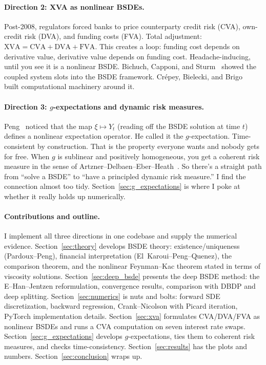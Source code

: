 \documentclass[11pt]{article}
\theoremstyle{definition}
\theoremstyle{remark}
\begin{document}
\paragraph{Direction 2: XVA as nonlinear BSDEs.}
Post-2008, regulators forced banks to price counterparty credit risk
(CVA), own-credit risk (DVA), and funding costs (FVA).
Total adjustment:
$\text{XVA} = \text{CVA} + \text{DVA} + \text{FVA}$.
This creates a loop: funding cost depends on derivative value, derivative
value depends on funding cost.
Headache-inducing, until you see it is a nonlinear BSDE.
Bichuch, Capponi, and Sturm~\cite{bichuch2018xva} showed the coupled
system slots into the BSDE framework.
Cr\'{e}pey, Bielecki, and Brigo~\cite{crepey2014counterparty} built
computational machinery around it.

\paragraph{Direction 3: $g$-expectations and dynamic risk measures.}
Peng~\cite{peng2004nonlinear,peng2019nonlinear} noticed that the map
$\xi \mapsto Y_t$ (reading off the BSDE solution at time $t$) defines a
nonlinear expectation operator.
He called it the $g$-expectation.
Time-consistent by construction. That is the property everyone wants
and nobody gets for free.
When $g$ is sublinear and positively homogeneous, you get a coherent
risk measure in the sense of
Artzner--Delbaen--Eber--Heath~\cite{artzner1999coherent}.
So there's a straight path from ``solve a BSDE'' to ``have a principled
dynamic risk measure.''
I find the connection almost too tidy. Section~\ref{sec:g_expectations}
is where I poke at whether it really holds up numerically.

\paragraph{Contributions and outline.}
I implement all three directions in one codebase and supply the
numerical evidence.
Section~\ref{sec:theory} develops BSDE theory:
existence/uniqueness (Pardoux--Peng), financial interpretation
(El~Karoui--Peng--Quenez), the comparison theorem, and the nonlinear
Feynman--Kac theorem stated in terms of viscosity solutions.
Section~\ref{sec:deep_bsde} presents the deep BSDE method: the
E--Han--Jentzen reformulation, convergence results, comparison with
DBDP and deep splitting.
Section~\ref{sec:numerics} is nuts and bolts: forward SDE
discretization, backward regression, Crank--Nicolson with Picard
iteration, PyTorch implementation details.
Section~\ref{sec:xva} formulates CVA/DVA/FVA as nonlinear BSDEs and
runs a CVA computation on seven interest rate swaps.
Section~\ref{sec:g_expectations} develops $g$-expectations, ties them
to coherent risk measures, and checks time-consistency.
Section~\ref{sec:results} has the plots and numbers.
Section~\ref{sec:conclusion} wraps up.
\end{document}

